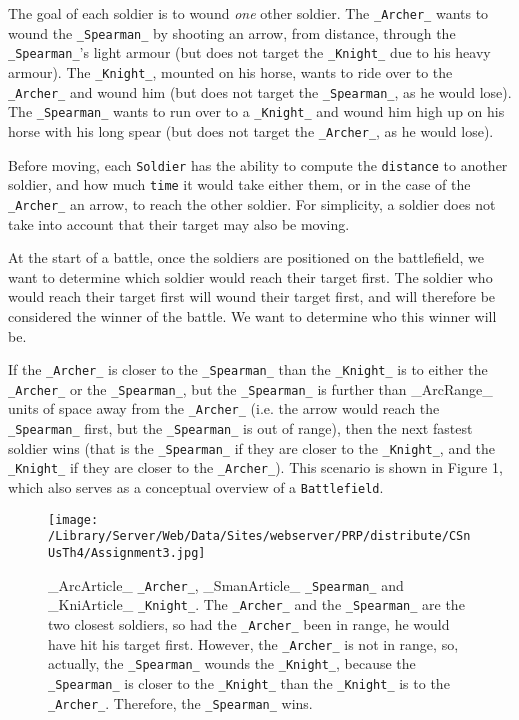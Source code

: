 \documentclass[11pt]{article}
\begin{document}
The goal of each soldier is to wound \emph{one} other soldier. The \texttt{_Archer_} wants to wound the \texttt{_Spearman_} by shooting an arrow, from distance, through the \texttt{_Spearman_}'s light armour (but does not target the \texttt{_Knight_} due to his heavy armour). The \texttt{_Knight_}, mounted on his horse, wants to ride over to the \texttt{_Archer_} and wound him (but does not target the \texttt{_Spearman_}, as he would lose). The \texttt{_Spearman_} wants to run over to a \texttt{_Knight_} and wound him high up on his horse with his long spear (but does not target the \texttt{_Archer_}, as he would lose). 

Before moving, each \texttt{Soldier} has the ability to compute the \texttt{distance} to another soldier, and how much \texttt{time} it would take either them, or in the case of the \texttt{_Archer_} an arrow, to reach the other soldier. For simplicity, a soldier does not take into account that their target may also be moving.

At the start of a battle, once the soldiers are positioned on the battlefield, we want to determine which soldier would reach their target first. The soldier who would reach their target first will wound their target first, and will therefore be considered the winner of the battle. We want to determine who this winner will be.

If the \texttt{_Archer_} is closer to the \texttt{_Spearman_} than the \texttt{_Knight_} is to either the \texttt{_Archer_} or the \texttt{_Spearman_}, but the \texttt{_Spearman_} is further than _ArcRange_ units of space away from the \texttt{_Archer_} (i.e. the arrow would reach the \texttt{_Spearman_} first, but the \texttt{_Spearman_} is out of range), then the next fastest soldier wins (that is the \texttt{_Spearman_} if they are closer to the \texttt{_Knight_}, and the \texttt{_Knight_} if they are closer to the \texttt{_Archer_}). This scenario is shown in Figure 1, which also serves as a conceptual overview of a \texttt{Battlefield}.


\begin{figure}
  	
	\centering
 	
	\texttt{[image: /Library/Server/Web/Data/Sites/webserver/PRP/distribute/CSnUsTh4/Assignment3.jpg]}

	\caption{_ArcArticle_ \texttt{_Archer_}, _SmanArticle_ \texttt{_Spearman_} and _KniArticle_ \texttt{_Knight_}. The \texttt{_Archer_} and the \texttt{_Spearman_} are the two closest soldiers, so had the \texttt{_Archer_} been in range, he would have hit his target first. However, the \texttt{_Archer_} is not in range, so, actually, the \texttt{_Spearman_} wounds the \texttt{_Knight_}, because the \texttt{_Spearman_} is closer to the \texttt{_Knight_} than the \texttt{_Knight_} is to the \texttt{_Archer_}. Therefore, the \texttt{_Spearman_} wins.}

	\label{fig:assignment3}

\end{figure}
\end{document}
